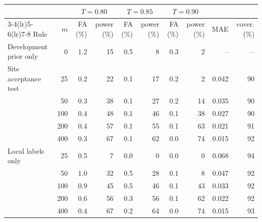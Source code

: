 \begin{tabular*}{\tblwidth}{@{\extracolsep{\fill}}lrrrrrrrrr@{}}
\toprule
 & & \multicolumn{2}{c}{$T=0.80$} & \multicolumn{2}{c}{$T=0.85$} & \multicolumn{2}{c}{$T=0.90$} & & \\
\cmidrule(lr){3-4}\cmidrule(lr){5-6}\cmidrule(lr){7-8}
Rule & $m$ & FA (\%) & power (\%) & FA (\%) & power (\%) & FA (\%) & power (\%) & MAE & cover. (\%) \\
\midrule
Development prior only & 0 & 1.2 & 15 & 0.5 & 8 & 0.3 & 2 & -- & -- \\
\addlinespace[2pt]
Site acceptance test & 25 & 0.2 & 22 & 0.1 & 17 & 0.2 & 2 & 0.042 & 90 \\
 & 50 & 0.3 & 38 & 0.1 & 27 & 0.2 & 14 & 0.035 & 90 \\
 & 100 & 0.4 & 48 & 0.1 & 46 & 0.1 & 38 & 0.027 & 90 \\
 & 200 & 0.4 & 57 & 0.1 & 55 & 0.1 & 63 & 0.021 & 91 \\
 & 400 & 0.3 & 67 & 0.1 & 62 & 0.0 & 74 & 0.015 & 92 \\
\addlinespace[2pt]
Local labels only & 25 & 0.5 & 7 & 0.0 & 0 & 0.0 & 0 & 0.068 & 94 \\
 & 50 & 1.0 & 32 & 0.5 & 28 & 0.1 & 8 & 0.047 & 92 \\
 & 100 & 0.9 & 45 & 0.5 & 46 & 0.1 & 43 & 0.033 & 92 \\
 & 200 & 0.6 & 56 & 0.3 & 56 & 0.1 & 62 & 0.022 & 92 \\
 & 400 & 0.4 & 67 & 0.2 & 64 & 0.0 & 74 & 0.015 & 93 \\
\bottomrule
\end{tabular*}
